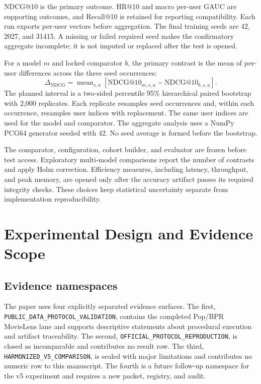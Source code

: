 \documentclass[10pt,a4paper]{article}
\begin{document}
NDCG@10 is the primary outcome. HR@10 and macro per-user GAUC are supporting
outcomes, and Recall@10 is retained for reporting compatibility. Each run
exports per-user vectors before aggregation. The final training seeds are 42,
2027, and 31415. A missing or failed required seed makes the confirmatory
aggregate incomplete; it is not imputed or replaced after the test is opened.

For a model $m$ and locked comparator $b$, the primary contrast is the mean of
per-user differences across the three seed occurrences:
\begin{equation}
  \Delta_{\mathrm{NDCG}} =
  \operatorname{mean}_{s,u}\left[
  \mathrm{NDCG@10}_{m,s,u} - \mathrm{NDCG@10}_{b,s,u}\right].
\end{equation}
The planned interval is a two-sided percentile 95\% hierarchical paired
bootstrap with 2,000 replicates. Each replicate resamples seed occurrences and,
within each occurrence, resamples user indices with replacement. The same user
indices are used for the model and comparator. The aggregate analysis uses a
NumPy PCG64 generator seeded with 42. No seed average is formed before the
bootstrap.

The comparator, configuration, cohort builder, and evaluator are frozen before
test access. Exploratory multi-model comparisons report the number of contrasts
and apply Holm correction. Efficiency measures, including latency, throughput,
and peak memory, are opened only after the accuracy artifact passes its required
integrity checks. These choices keep statistical uncertainty separate from
implementation reproducibility.

\section{Experimental Design and Evidence Scope}

\subsection{Evidence namespaces}

The paper uses four explicitly separated evidence surfaces. The first,
\texttt{PUBLIC\_DATA\_PROTOCOL\_VALIDATION}, contains the completed Pop/BPR MovieLens
lane and supports descriptive statements about procedural execution and
artifact traceability. The second, \texttt{OFFICIAL\_PROTOCOL\_REPRODUCTION}, is closed
as incomparable and contributes no result row. The third,
\texttt{HARMONIZED\_V5\_COMPARISON}, is sealed with major limitations and contributes no
numeric row to this manuscript. The fourth is a future follow-up namespace for
the v5 experiment and requires a new packet, registry, and audit.
\end{document}
